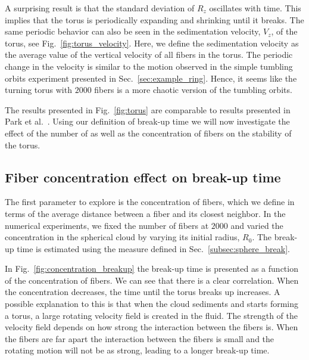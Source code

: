 A surprising result is that the standard deviation of $R_z$ oscillates with time. This implies that the torus is periodically expanding and shrinking until it breaks. The same periodic behavior can also be seen in the sedimentation velocity, $V_z$, of the torus, see Fig.~\ref{fig:torus_velocity}. Here, we define the sedimentation velocity as the average value of the vertical velocity of all fibers in the torus. The periodic change in the velocity is similar to the motion observed in the simple tumbling orbits experiment presented in Sec.~\ref{sec:example_ring}. Hence, it seems like the turning torus with $2000$ fibers is a more chaotic version of the tumbling orbits.

The results presented in Fig.~\ref{fig:torus} are comparable to results presented in Park et al.~\cite{Park2010}. Using our definition of break-up time we will now investigate the effect of the number of as well as the concentration of fibers on the stability of the torus.

\subsection{Fiber concentration effect on break-up time}
\label{subsec:effect_concentration}

The first parameter to explore is the concentration of fibers, which we define in terms of the average distance between a fiber and its closest neighbor. In the numerical experiments, we fixed the number of fibers at $2000$ and varied the concentration in the spherical cloud by varying its initial radius, $R_0$. The break-up time is estimated using the measure defined in Sec.~\ref{subsec:sphere_break}.

In Fig.~\ref{fig:concentration_breakup} the break-up time is presented as a function of the concentration of fibers. We can see that there is a clear correlation. When the concentration decreases, the time until the torus breaks up increases. A possible explanation to this is that when the cloud sediments and starts forming a torus, a large rotating velocity field is created in the fluid. The strength of the velocity field depends on how strong the interaction between the fibers is. When the fibers are far apart the interaction between the fibers is small and the rotating motion will not be as strong, leading to a longer break-up time.

